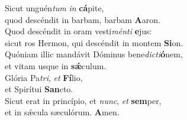 \evenverse Sicut unguén\textit{tum} \textit{in} \textbf{cá}pite,~\*\\
\evenverse quod descéndit in barbam, barbam \textbf{A}aron.\\
\oddverse Quod descéndit in oram vesti\textit{mén}\textit{ti} \textbf{e}jus:~\*\\
\oddverse sicut ros Hermon, qui descéndit in montem \textbf{Si}on.\\
\evenverse Quóniam illic mandávit Dóminus bene\textit{di}\textit{cti}\textbf{ó}nem,~\*\\
\evenverse et vitam usque in \textbf{sǽ}culum.\\
\oddverse Glória Pa\textit{tri}, \textit{et} \textbf{Fí}lio,~\*\\
\oddverse et Spirítui \textbf{San}cto.\\
\evenverse Sicut erat in princípio, et \textit{nunc}, \textit{et} \textbf{sem}per,~\*\\
\evenverse et in sǽcula sæculórum. \textbf{A}men.\\
